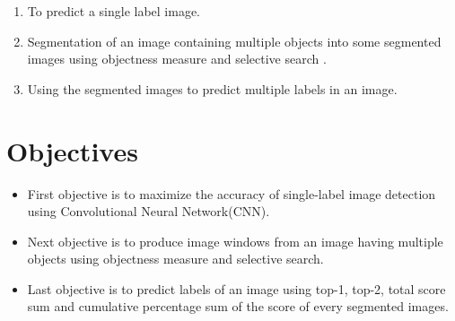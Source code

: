 \begin{enumerate}
  \item To predict a single label image.
  \item Segmentation of an image containing multiple objects into some segmented images using objectness measure \cite{15} and selective search \cite{16}.
  \item Using the segmented images to predict multiple labels in an image. 
\end{enumerate}


\section{Objectives}

\begin{itemize}
  \item First objective is to maximize the accuracy of single-label image detection using Convolutional Neural Network(CNN).
  \item Next objective is to produce image windows from an image having multiple objects using objectness measure and selective search.
  \item Last objective is to predict labels of an image using top-1, top-2, total score sum and cumulative percentage sum of the score of every segmented images.
\end{itemize}



